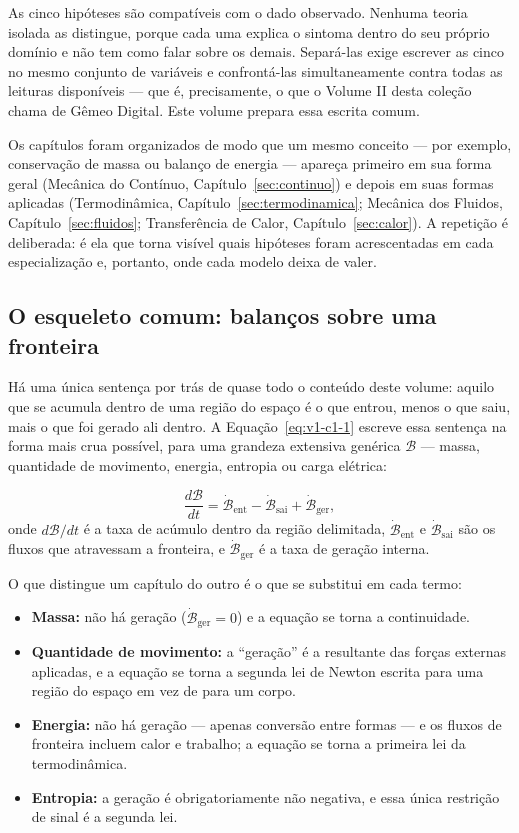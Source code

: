 \documentclass[12pt,a4paper]{article}
\numberwithin{equation}{section}
\numberwithin{table}{section}
\numberwithin{figure}{section}
\begin{document}
As cinco hipóteses são compatíveis com o dado observado. Nenhuma teoria
isolada as distingue, porque cada uma explica o sintoma dentro do seu próprio
domínio e não tem como falar sobre os demais. Separá-las exige escrever as
cinco no mesmo conjunto de variáveis e confrontá-las simultaneamente contra
todas as leituras disponíveis --- que é, precisamente, o que o Volume II desta
coleção chama de Gêmeo Digital. Este volume prepara essa escrita comum.

Os capítulos foram organizados de modo que um mesmo conceito --- por exemplo,
conservação de massa ou balanço de energia --- apareça primeiro em sua forma
geral (Mecânica do Contínuo, Capítulo~\ref{sec:continuo}) e depois em suas
formas aplicadas (Termodinâmica, Capítulo~\ref{sec:termodinamica}; Mecânica
dos Fluidos, Capítulo~\ref{sec:fluidos}; Transferência de Calor,
Capítulo~\ref{sec:calor}). A repetição é deliberada: é ela que torna visível
quais hipóteses foram acrescentadas em cada especialização e, portanto, onde
cada modelo deixa de valer.

\subsection{O esqueleto comum: balanços sobre uma fronteira}

Há uma única sentença por trás de quase todo o conteúdo deste volume: aquilo
que se acumula dentro de uma região do espaço é o que entrou, menos o que
saiu, mais o que foi gerado ali dentro. A Equação~\eqref{eq:v1-c1-1} escreve
essa sentença na forma mais crua possível, para uma grandeza extensiva
genérica $\mathcal{B}$ --- massa, quantidade de movimento, energia, entropia
ou carga elétrica:

\begin{equation}\label{eq:v1-c1-1}
\frac{d\mathcal{B}}{dt} = \dot{\mathcal{B}}_{\text{ent}} -
\dot{\mathcal{B}}_{\text{sai}} + \dot{\mathcal{B}}_{\text{ger}},
\end{equation}
onde $d\mathcal{B}/dt$ é a taxa de acúmulo dentro da região delimitada,
$\dot{\mathcal{B}}_{\text{ent}}$ e $\dot{\mathcal{B}}_{\text{sai}}$ são os
fluxos que atravessam a fronteira, e $\dot{\mathcal{B}}_{\text{ger}}$ é a taxa
de geração interna.

O que distingue um capítulo do outro é o que se substitui em cada termo:

\begin{itemize}
	\item \textbf{Massa:} não há geração ($\dot{\mathcal{B}}_{\text{ger}}=0$) e
	a equação se torna a continuidade.
	\item \textbf{Quantidade de movimento:} a ``geração'' é a resultante das
	forças externas aplicadas, e a equação se torna a segunda lei de Newton
	escrita para uma região do espaço em vez de para um corpo.
	\item \textbf{Energia:} não há geração --- apenas conversão entre formas
	--- e os fluxos de fronteira incluem calor e trabalho; a equação se torna a
	primeira lei da termodinâmica.
	\item \textbf{Entropia:} a geração é obrigatoriamente não negativa, e essa
	única restrição de sinal é a segunda lei.
\end{itemize}
\end{document}
